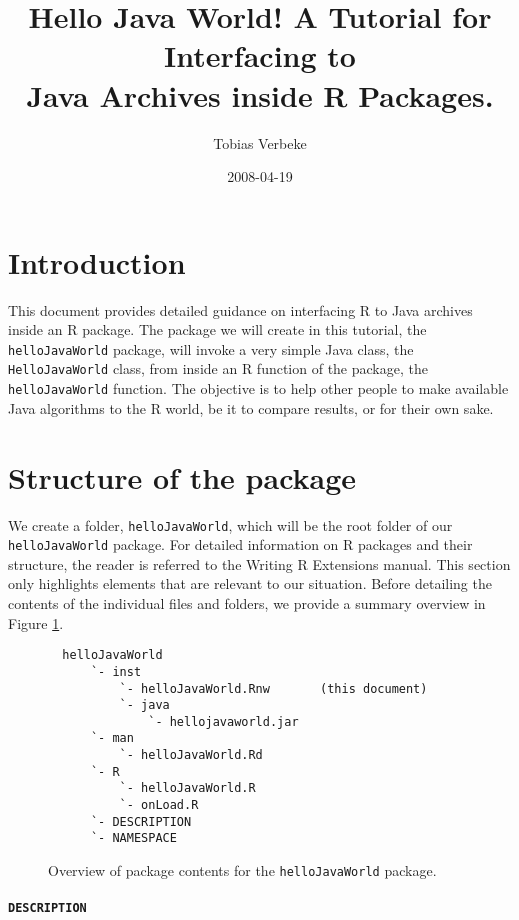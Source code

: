 \documentclass[a4paper, 11pt]{article}
\begin{document}
\title{Hello Java World! A Tutorial for Interfacing to\\ Java Archives
       inside R Packages. }
\author{Tobias Verbeke}
\date{2008-04-19}

\maketitle

\tableofcontents

\section{Introduction}

This document provides detailed guidance on interfacing R to Java archives
inside an R package. The package we will create in this tutorial, the 
\texttt{helloJavaWorld} package, will invoke a very simple Java class, 
the \texttt{HelloJavaWorld} class, from inside an R function of the package, 
the \texttt{helloJavaWorld} function. The objective is to help other people
to make available Java algorithms to the R world, be it to compare results,
or for their own sake.

\section{Structure of the package}

We create a folder, \texttt{helloJavaWorld}, which will be the root folder
of our \texttt{helloJavaWorld} package. For detailed information on R packages
and their structure, the reader is referred to the Writing R Extensions manual. 
This section only highlights elements that are relevant to our situation.
Before detailing the contents of the individual files and folders, we 
provide a summary overview in Figure \ref{fig:pkgContents}.
\begin{figure}
\begin{verbatim}
  helloJavaWorld
      `- inst
          `- helloJavaWorld.Rnw       (this document)
          `- java
              `- hellojavaworld.jar    
      `- man
          `- helloJavaWorld.Rd
      `- R
          `- helloJavaWorld.R
          `- onLoad.R
      `- DESCRIPTION
      `- NAMESPACE
\end{verbatim}
\caption{Overview of package contents for the \texttt{helloJavaWorld} package.}
\label{fig:pkgContents}
\end{figure}


\paragraph{\texttt{DESCRIPTION}}
\end{document}
